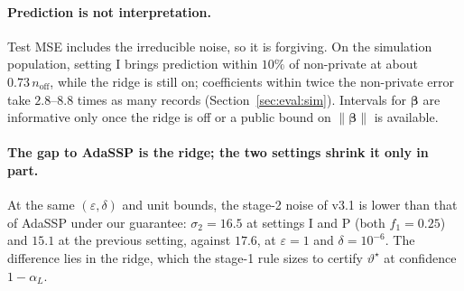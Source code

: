 \documentclass[11pt]{article}
\theoremstyle{definition}
\theoremstyle{plain}
\newcommand{\bbeta}{\boldsymbol{\beta}}
\begin{document}
\paragraph{Prediction is not interpretation.} Test MSE includes the irreducible noise, so it is forgiving. On the simulation population, setting I brings prediction within $10\%$ of non-private at about $0.73\,n_{\mathrm{off}}$, while the ridge is still on; coefficients within twice the non-private error take $2.8$--$8.8$ times as many records (Section~\ref{sec:eval:sim}). Intervals for $\bbeta$ are informative only once the ridge is off or a public bound on $\|\bbeta\|$ is available.

\paragraph{The gap to AdaSSP is the ridge; the two settings shrink it only in part.} At the same $(\varepsilon, \delta)$ and unit bounds, the stage-2 noise of v3.1 is lower than that of AdaSSP under our guarantee: $\sigma_2 = 16.5$ at settings I and P (both $f_1 = 0.25$) and $15.1$ at the previous setting, against $17.6$, at $\varepsilon = 1$ and $\delta = 10^{-6}$. The difference lies in the ridge, which the stage-1 rule sizes to certify $\vartheta^\star$ at confidence $1 - \alpha_L$.
\end{document}
